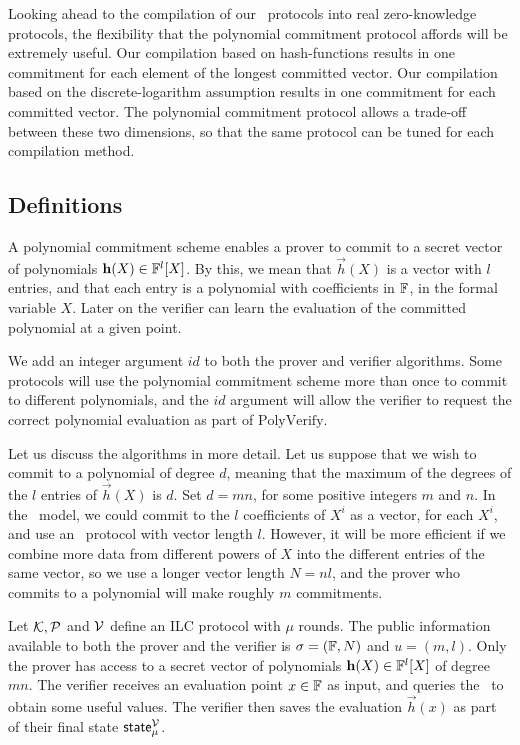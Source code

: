 Looking ahead to the compilation of our \ILC\ protocols into real zero-knowledge protocols, the flexibility that the polynomial commitment protocol affords will be extremely useful. Our compilation based on hash-functions results in one commitment for each element of the longest committed vector. Our compilation based on the discrete-logarithm assumption results in one commitment for each committed vector. The polynomial commitment protocol allows a trade-off between these two dimensions, so that the same protocol can be tuned for each compilation method.

\subsection{Definitions}
A polynomial commitment scheme enables a prover to commit to a secret vector of polynomials $\mathbf{h}(X) \in \mathbb{F}^l[X]$. By this, we mean that $\vec{h}(X)$ is a vector with $l$ entries, and that each entry is a polynomial with coefficients in $\mathbb{F}$, in the formal variable $X$. Later on the verifier can learn the evaluation of the committed polynomial at a given point.

We add an integer argument $id$ to both the prover and verifier algorithms. Some protocols will use the polynomial commitment scheme more than once to commit to different polynomials, and the $id$ argument will allow the verifier to request the correct polynomial evaluation as part of $\mathrm{PolyVerify}$.

Let us discuss the algorithms in more detail. Let us suppose that we wish to commit to a polynomial of degree $d$, meaning that the maximum of the degrees of the $l$ entries of $\vec{h}(X)$ is $d$. Set $d = mn$, for some positive integers $m$ and $n$. In the \ILC\ model, we could commit to the $l$ coefficients of $X^i$ as a vector, for each $X^i$, and use an \ILC\ protocol with vector length $l$. However, it will be more efficient if we combine more data from different powers of $X$ into the different entries of the same vector, so we use a longer vector length $N = nl$, and the prover who commits to a polynomial will make roughly $m$ commitments.

Let $\mathcal{K}, \mathcal{P}$ and $\mathcal{V}$ define an ILC protocol with $\mu$ rounds. The public information available to both the prover and the verifier is $\mathsf{\sigma} = (\mathbb{F},N)$ and $u = (m,l)$. Only the prover has access to a secret vector of polynomials $\mathbf{h}(X) \in \mathbb{F}^l[X]$ of degree $mn$. The verifier receives an evaluation point $x \in \mathbb{F}$ as input, and queries the \ILC\ to obtain some useful values. The verifier then saves the evaluation $\vec{h}(x)$ as part of their final state $\mathsf{state}^{\mathcal{V}}_\mu$.

